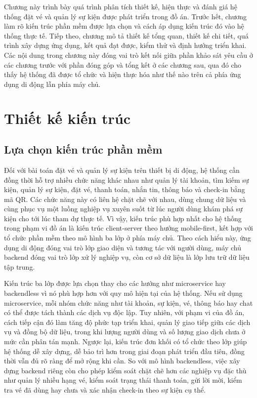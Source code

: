 \documentclass[../DoAn.tex]{subfiles}
\begin{document}
Chương này trình bày quá trình phân tích thiết kế, hiện thực và đánh giá hệ thống đặt vé và quản lý sự kiện được phát triển trong đồ án. Trước hết, chương làm rõ kiến trúc phần mềm được lựa chọn và cách áp dụng kiến trúc đó vào hệ thống thực tế. Tiếp theo, chương mô tả thiết kế tổng quan, thiết kế chi tiết, quá trình xây dựng ứng dụng, kết quả đạt được, kiểm thử và định hướng triển khai. Các nội dung trong chương này đóng vai trò kết nối giữa phần khảo sát yêu cầu ở các chương trước với phần đóng góp và tổng kết ở các chương sau, qua đó cho thấy hệ thống đã được tổ chức và hiện thực hóa như thế nào trên cả phía ứng dụng di động lẫn phía máy chủ.

\section{Thiết kế kiến trúc}
\subsection{Lựa chọn kiến trúc phần mềm}
Đối với bài toán đặt vé và quản lý sự kiện trên thiết bị di động, hệ thống cần đồng thời hỗ trợ nhiều chức năng khác nhau như quản lý tài khoản, tìm kiếm sự kiện, quản lý sự kiện, đặt vé, thanh toán, nhắn tin, thông báo và check-in bằng mã \gls{QR}. Các chức năng này có liên hệ chặt chẽ với nhau, dùng chung dữ liệu và cùng phục vụ một luồng nghiệp vụ xuyên suốt từ lúc người dùng khám phá sự kiện cho tới lúc tham dự thực tế. Vì vậy, kiến trúc phù hợp nhất cho hệ thống trong phạm vi đồ án là kiến trúc client-server theo hướng mobile-first, kết hợp với tổ chức phần mềm theo mô hình ba lớp ở phía máy chủ. Theo cách hiểu này, ứng dụng di động đóng vai trò lớp giao diện và tương tác với người dùng, máy chủ backend đóng vai trò lớp xử lý nghiệp vụ, còn cơ sở dữ liệu là lớp lưu trữ dữ liệu tập trung.

Kiến trúc ba lớp được lựa chọn thay cho các hướng như microservice hay backendless vì nó phù hợp hơn với quy mô hiện tại của hệ thống. Nếu sử dụng microservice, mỗi nhóm chức năng như tài khoản, sự kiện, vé, thông báo hay chat có thể được tách thành các dịch vụ độc lập. Tuy nhiên, với phạm vi của đồ án, cách tiếp cận đó làm tăng độ phức tạp triển khai, quản lý giao tiếp giữa các dịch vụ và đồng bộ dữ liệu, trong khi lượng người dùng và số lượng giao dịch chưa ở mức cần phân tán mạnh. Ngược lại, kiến trúc đơn khối có tổ chức theo lớp giúp hệ thống dễ xây dựng, dễ bảo trì hơn trong giai đoạn phát triển đầu tiên, đồng thời vẫn đủ rõ ràng để mở rộng khi cần. So với mô hình backendless, việc xây dựng backend riêng còn cho phép kiểm soát chặt chẽ hơn các nghiệp vụ đặc thù như quản lý nhiều hạng vé, kiểm soát trạng thái thanh toán, gửi lời mời, kiểm tra vé đã dùng hay chưa và xác nhận check-in theo sự kiện cụ thể.
\end{document}
